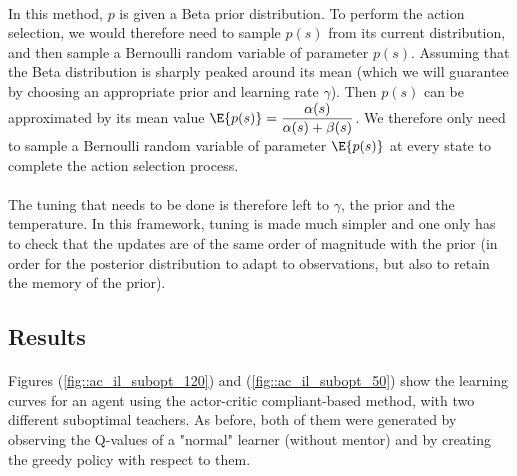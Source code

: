 \documentclass[a4paper]{report}
\begin{document}
{{{{			\paragraph{} In this method, $p$ is given a Beta prior distribution. To perform the action selection, we would therefore need to sample $p(s)$ from its current distribution, and then sample a Bernoulli random variable of parameter $p(s)$. Assuming that the Beta distribution is sharply peaked around its mean (which we will guarantee by choosing an appropriate prior and learning rate $\gamma$). Then $p(s)$ can be approximated by its mean value $\E{p(s)} = \displaystyle\frac{\alpha(s)}{\alpha(s) + \beta(s)}$. We therefore only need to sample a Bernoulli random variable of parameter $\E{p(s)}$ at every state to complete the action selection process. 
			
			\paragraph{} The tuning that needs to be done is therefore left to $\gamma$, the prior and the temperature. In this framework, tuning is made much simpler and one only has to check that the updates are of the same order of magnitude with the prior (in order for the posterior distribution to adapt to observations, but also to retain the memory of the prior). 
			}
			\subsection{Results}
			{
				\paragraph{} Figures (\ref{fig::ac_il_subopt_120}) and (\ref{fig::ac_il_subopt_50}) show the learning curves for an agent using the actor-critic compliant-based method, with two different suboptimal teachers. As before, both of them were generated by observing the Q-values of a "normal" learner (without mentor) and by creating the greedy policy with respect to them.  
				
}}}}
\end{document}
